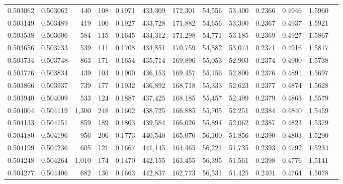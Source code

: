 \begin{tabular}{rrrrrrrrrrrrr}
0.503062 & 0.503062 &   440 &   108 &                                     0.1971 & 433,309 & 172,301 &  54,556 &  53,400 & 0.2366 & 0.4946 & 1.5960 \\
0.503149 & 0.503489 &   419 &   100 &                                     0.1927 & 433,728 & 171,882 &  54,656 &  53,300 & 0.2367 & 0.4937 & 1.5921 \\
0.503538 & 0.503606 &   584 &   115 &                                     0.1645 & 434,312 & 171,298 &  54,771 &  53,185 & 0.2369 & 0.4927 & 1.5867 \\
0.503656 & 0.503733 &   539 &   111 &                                     0.1708 & 434,851 & 170,759 &  54,882 &  53,074 & 0.2371 & 0.4916 & 1.5817 \\
0.503734 & 0.503748 &   863 &   171 &                                     0.1654 & 435,714 & 169,896 &  55,053 &  52,903 & 0.2374 & 0.4900 & 1.5738 \\
0.503776 & 0.503834 &   439 &   103 &                                     0.1900 & 436,153 & 169,457 &  55,156 &  52,800 & 0.2376 & 0.4891 & 1.5697 \\
0.503866 & 0.503937 &   739 &   177 &                                     0.1932 & 436,892 & 168,718 &  55,333 &  52,623 & 0.2377 & 0.4874 & 1.5628 \\
0.503940 & 0.504009 &   533 &   124 &                                     0.1887 & 437,425 & 168,185 &  55,457 &  52,499 & 0.2379 & 0.4863 & 1.5579 \\
0.504064 & 0.504119 & 1,300 &   248 &                                     0.1602 & 438,725 & 166,885 &  55,705 &  52,251 & 0.2384 & 0.4840 & 1.5459 \\
0.504133 & 0.504151 &   859 &   189 &                                     0.1803 & 439,584 & 166,026 &  55,894 &  52,062 & 0.2387 & 0.4823 & 1.5379 \\
0.504180 & 0.504196 &   956 &   206 &                                     0.1773 & 440,540 & 165,070 &  56,100 &  51,856 & 0.2390 & 0.4803 & 1.5290 \\
0.504199 & 0.504236 &   605 &   121 &                                     0.1667 & 441,145 & 164,465 &  56,221 &  51,735 & 0.2393 & 0.4792 & 1.5234 \\
0.504248 & 0.504264 & 1,010 &   174 &                                     0.1470 & 442,155 & 163,455 &  56,395 &  51,561 & 0.2398 & 0.4776 & 1.5141 \\
0.504277 & 0.504406 &   682 &   136 &                                     0.1663 & 442,837 & 162,773 &  56,531 &  51,425 & 0.2401 & 0.4764 & 1.5078 \\

\end{tabular}
